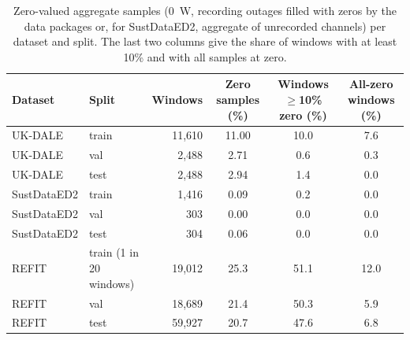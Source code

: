 \begin{table}[H]
\centering
\caption{Zero-valued aggregate samples (0~W, recording outages filled with zeros by the data packages or, for SustDataED2, aggregate of unrecorded channels) per dataset and split. The last two columns give the share of windows with at least 10\% and with all samples at zero.}
\label{tab:gap_stats}
\footnotesize
\begin{tabular}{@{}llrccc@{}}
\toprule
Dataset & Split & Windows & Zero samples (\%) & Windows $\geq$10\% zero (\%) & All-zero windows (\%) \\
\midrule
UK-DALE & train & 11{,}610 & 11.00 & 10.0 & 7.6 \\
UK-DALE & val & 2{,}488 & 2.71 & 0.6 & 0.3 \\
UK-DALE & test & 2{,}488 & 2.94 & 1.4 & 0.0 \\
SustDataED2 & train & 1{,}416 & 0.09 & 0.2 & 0.0 \\
SustDataED2 & val & 303 & 0.00 & 0.0 & 0.0 \\
SustDataED2 & test & 304 & 0.06 & 0.0 & 0.0 \\
REFIT & train (1 in 20 windows) & 19{,}012 & 25.3 & 51.1 & 12.0 \\
REFIT & val & 18{,}689 & 21.4 & 50.3 & 5.9 \\
REFIT & test & 59{,}927 & 20.7 & 47.6 & 6.8 \\
\bottomrule
\end{tabular}
\end{table}

